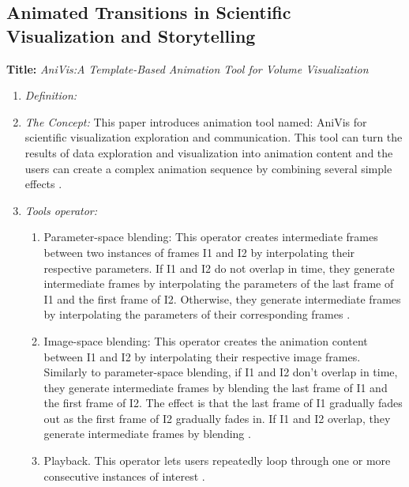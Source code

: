 \documentclass{egpubl}
\begin{document}
\subsection{Animated Transitions in Scientific Visualization and Storytelling}
\textbf{Title:} \textit{AniVis:A Template-Based Animation Tool for Volume Visualization}
\begin{enumerate}
\item \textit{Definition:} 
\item \textit{The Concept:} This paper introduces animation tool named: AniVis for scientific visualization exploration and communication. This tool can turn the results of data exploration and visualization into animation content and the users can create a complex animation sequence by combining several simple effects \cite{Akiba}.
\item \textit{Tools operator:}
\begin{enumerate}
\item Parameter-space blending: This operator creates intermediate frames between two instances of frames I1 and I2 by interpolating their respective parameters. If I1 and I2 do not overlap in time, they generate intermediate frames by interpolating the parameters of the last frame of I1 and the first frame of I2. Otherwise, they generate intermediate frames by interpolating the parameters of their corresponding frames \cite{Akiba}.

\item Image-space blending: This operator creates the animation content between I1 and I2 by interpolating their respective image frames. Similarly to parameter-space blending, if I1 and I2 don't overlap in time, they generate intermediate frames by blending the last frame of I1 and the first frame of I2. The effect is that the last frame of I1 gradually fades out as the first frame of I2 gradually fades in. If I1 and I2 overlap, they generate intermediate frames by blending \cite{Akiba}.

\item Playback. This operator lets users repeatedly loop through one or more consecutive instances of interest \cite{Akiba}.

\end{enumerate}


\end{enumerate}
\end{document}

